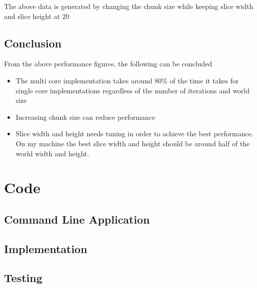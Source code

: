 \documentclass{article}
\newcommand{\code}[1]{{\ttfamily #1}}
\begin{document}
      The above data is generated by changing the chunk size while
      keeping slice width and slice height at 20

    \subsection{Conclusion}

      From the above performance figures, the following can be concluded

      \begin{itemize}
        \item The multi core implementation takes around 80\% of the time
        it takes for single core implementations regardless of the number
        of iterations and world size
        \item Increasing chunk size can reduce performance
        \item Slice width and height needs tuning in order to achieve the
        best performance. On my machine the best slice width and height
        should be around half of the world width and height.
      \end{itemize}

  \section{Code}

    \subsection{Command Line Application}

      
      

    \subsection{Implementation}

      
      
      
      
      

    \subsection{Testing}

      
      
      
      
      
      
\end{document}
